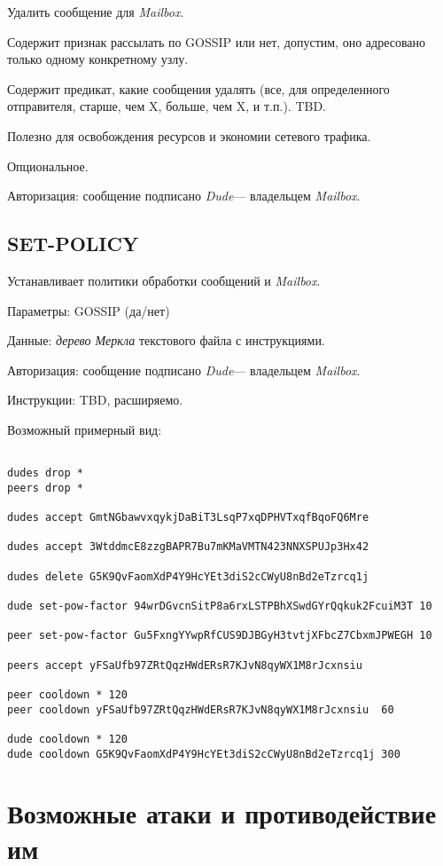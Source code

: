 \documentclass[11pt,a4paper]{article}
\newcommand{\term}[2]{\textit{#2}}
\newcommand{\Dude}{\term{dude}{Dude}}
\newcommand{\Mailbox}{\term{mailbox}{Mailbox}}
\begin{document}
Удалить сообщение для \Mailbox{}.

Содержит признак рассылать по GOSSIP или нет, допустим, оно адресовано только
одному конкретному узлу.

Содержит предикат, какие сообщения удалять (все, для определенного отправителя,
старше, чем X, больше, чем X, и т.п.). TBD.

Полезно для освобождения ресурсов и экономии сетевого трафика.

Опциональное.

Авторизация: сообщение подписано \Dude --- владельцем  \Mailbox{}.

\subsection{SET-POLICY}

Устанавливает политики обработки сообщений и \Mailbox{}.

Параметры: GOSSIP (да/нет)

Данные: \term{term}{дерево Меркла} текстового файла с инструкциями.

Авторизация: сообщение подписано \Dude --- владельцем  \Mailbox{}.

Инструкции: TBD, расширяемо.

Возможный примерный вид:

\begin{verbatim}

dudes drop *
peers drop *

dudes accept GmtNGbawvxqykjDaBiT3LsqP7xqDPHVTxqfBqoFQ6Mre

dudes accept 3WtddmcE8zzgBAPR7Bu7mKMaVMTN423NNXSPUJp3Hx42

dudes delete G5K9QvFaomXdP4Y9HcYEt3diS2cCWyU8nBd2eTzrcq1j

dude set-pow-factor 94wrDGvcnSitP8a6rxLSTPBhXSwdGYrQqkuk2FcuiM3T 10

peer set-pow-factor Gu5FxngYYwpRfCUS9DJBGyH3tvtjXFbcZ7CbxmJPWEGH 10

peers accept yFSaUfb97ZRtQqzHWdERsR7KJvN8qyWX1M8rJcxnsiu

peer cooldown * 120
peer cooldown yFSaUfb97ZRtQqzHWdERsR7KJvN8qyWX1M8rJcxnsiu  60

dude cooldown * 120
dude cooldown G5K9QvFaomXdP4Y9HcYEt3diS2cCWyU8nBd2eTzrcq1j 300

\end{verbatim}


\section{Возможные атаки и противодействие им}
\end{document}
